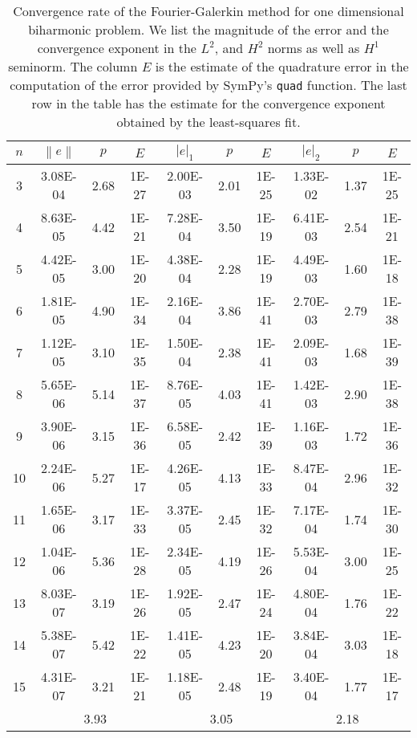 \documentclass[a4paper,10pt]{article}
\newcommand{\norm}[1]{\ensuremath{\left\|#1\right\|}}
\newcommand{\seminorm}[1]{\ensuremath{\left|#1\right|}}
\begin{document}
  \begin{table}
    \centering
    \begin{tabular}{|c|c|c|c||c|c|c||c|c|c|}
    \hline
    $n$ & $\norm{e}$ & $p$ & $E$ & $\seminorm{e}_1$ & $p$ & $E$ & $\seminorm{e}_2$ & $p$ & $E$\\
\hline
3 & 3.08E-04 & 2.68 & 1E-27 & 2.00E-03 & 2.01 & 1E-25 & 1.33E-02 & 1.37 & 1E-25\\
4 & 8.63E-05 & 4.42 & 1E-21 & 7.28E-04 & 3.50 & 1E-19 & 6.41E-03 & 2.54 & 1E-21\\
5 & 4.42E-05 & 3.00 & 1E-20 & 4.38E-04 & 2.28 & 1E-19 & 4.49E-03 & 1.60 & 1E-18\\
6 & 1.81E-05 & 4.90 & 1E-34 & 2.16E-04 & 3.86 & 1E-41 & 2.70E-03 & 2.79 & 1E-38\\
7 & 1.12E-05 & 3.10 & 1E-35 & 1.50E-04 & 2.38 & 1E-41 & 2.09E-03 & 1.68 & 1E-39\\
8 & 5.65E-06 & 5.14 & 1E-37 & 8.76E-05 & 4.03 & 1E-41 & 1.42E-03 & 2.90 & 1E-38\\
9 & 3.90E-06 & 3.15 & 1E-36 & 6.58E-05 & 2.42 & 1E-39 & 1.16E-03 & 1.72 & 1E-36\\
10 & 2.24E-06 & 5.27 & 1E-17 & 4.26E-05 & 4.13 & 1E-33 & 8.47E-04 & 2.96 & 1E-32\\
11 & 1.65E-06 & 3.17 & 1E-33 & 3.37E-05 & 2.45 & 1E-32 & 7.17E-04 & 1.74 & 1E-30\\
12 & 1.04E-06 & 5.36 & 1E-28 & 2.34E-05 & 4.19 & 1E-26 & 5.53E-04 & 3.00 & 1E-25\\
13 & 8.03E-07 & 3.19 & 1E-26 & 1.92E-05 & 2.47 & 1E-24 & 4.80E-04 & 1.76 & 1E-22\\
14 & 5.38E-07 & 5.42 & 1E-22 & 1.41E-05 & 4.23 & 1E-20 & 3.84E-04 & 3.03 & 1E-18\\
15 & 4.31E-07 & 3.21 & 1E-21 & 1.18E-05 & 2.48 & 1E-19 & 3.40E-04 & 1.77 & 1E-17\\
\hline
    \hline
    & \multicolumn{3}{c||}{3.93} &
      \multicolumn{3}{c||}{3.05} &
      \multicolumn{3}{c|}{2.18}\\
    \hline
    \end{tabular}
    \caption{Convergence rate of the Fourier-Galerkin method for one dimensional
    biharmonic problem. We list the magnitude of the error and the convergence
    exponent in the $L^2$, and $H^2$ norms as well as $H^1$ seminorm. The column
    $E$ is the estimate of the quadrature error in the computation of the error
    provided by SymPy's {\tt{quad}} function. The last row in the table has the
    estimate for the convergence exponent obtained by the least-squares fit.}
    \label{tab:eig_b_1d}
  \end{table}
\end{document}
